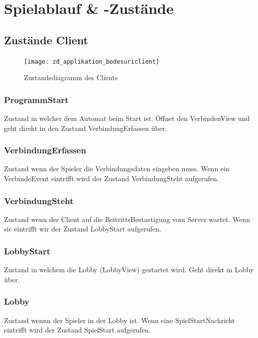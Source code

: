 \documentclass[12pt,halfparskip]{scrartcl}
\begin{document}

\clearpage
\section{Spielablauf \& -Zustände} %
\label{spielzustaende_nachrichten}
\subsection{Zustände Client} %
\label{sub:zustände_client}
\begin{figure}[h]
	\centering
	\texttt{[image: zd\_applikation\_bodesuriclient]}
	\caption{Zustandsdiagramm des Clients}
	\label{fig:zd_applikation_bodesuriclient}
\end{figure}

\subsubsection{ProgrammStart} %
\label{ssub:programmstart}
Zustand in welcher dem Automat beim Start ist. Öffnet den VerbindenView und geht direkt in den Zustand VerbindungErfassen über.

\subsubsection{VerbindungErfassen} %
\label{ssub:verbinungerfassen}
Zustand wenn der Spieler die Verbindungsdaten eingeben muss. Wenn ein VerbindeEvent eintrifft wird der Zustand VerbindungSteht aufgerufen.

\subsubsection{VerbindungSteht} %
\label{ssub:verbindungsteht}
Zustand wenn der Client auf die BeitrittsBestaetigung vom Server wartet. Wenn sie eintrifft wir der Zustand LobbyStart aufgerufen.

\subsubsection{LobbyStart} %
\label{ssub:lobbystart}
Zustand in welchem die Lobby (LobbyView) gestartet wird. Geht direkt in Lobby über.

\subsubsection{Lobby} %
\label{ssub:lobby}
Zustand wennn der Spieler in der Lobby ist. Wenn eine SpielStartNachricht eintrifft wird der Zustand SpielStart aufgerufen.
\end{document}
